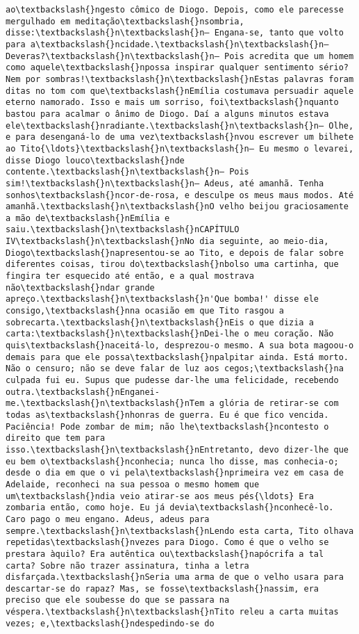 \documentclass[11pt]{article}
\begin{document}
\begin{Verbatim}[commandchars=\\\{\}]
ao\textbackslash{}ngesto cômico de Diogo. Depois, como ele parecesse mergulhado em meditação\textbackslash{}nsombria, disse:\textbackslash{}n\textbackslash{}n— Engana-se, tanto que volto para a\textbackslash{}ncidade.\textbackslash{}n\textbackslash{}n— Deveras?\textbackslash{}n\textbackslash{}n— Pois acredita que um homem como aquele\textbackslash{}npossa inspirar qualquer sentimento sério? Nem por sombras!\textbackslash{}n\textbackslash{}nEstas palavras foram ditas no tom com que\textbackslash{}nEmília costumava persuadir aquele eterno namorado. Isso e mais um sorriso, foi\textbackslash{}nquanto bastou para acalmar o ânimo de Diogo. Daí a alguns minutos estava ele\textbackslash{}nradiante.\textbackslash{}n\textbackslash{}n— Olhe, e para desenganá-lo de uma vez\textbackslash{}nvou escrever um bilhete ao Tito{\ldots}\textbackslash{}n\textbackslash{}n— Eu mesmo o levarei, disse Diogo louco\textbackslash{}nde contente.\textbackslash{}n\textbackslash{}n— Pois sim!\textbackslash{}n\textbackslash{}n— Adeus, até amanhã. Tenha sonhos\textbackslash{}ncor-de-rosa, e desculpe os meus maus modos. Até amanhã.\textbackslash{}n\textbackslash{}nO velho beijou graciosamente a mão de\textbackslash{}nEmília e saiu.\textbackslash{}n\textbackslash{}nCAPÍTULO IV\textbackslash{}n\textbackslash{}nNo dia seguinte, ao meio-dia, Diogo\textbackslash{}napresentou-se ao Tito, e depois de falar sobre diferentes coisas, tirou do\textbackslash{}nbolso uma cartinha, que fingira ter esquecido até então, e a qual mostrava não\textbackslash{}ndar grande apreço.\textbackslash{}n\textbackslash{}n'Que bomba!' disse ele consigo,\textbackslash{}nna ocasião em que Tito rasgou a sobrecarta.\textbackslash{}n\textbackslash{}nEis o que dizia a carta:\textbackslash{}n\textbackslash{}nDei-lhe o meu coração. Não quis\textbackslash{}naceitá-lo, desprezou-o mesmo. A sua bota magoou-o demais para que ele possa\textbackslash{}npalpitar ainda. Está morto. Não o censuro; não se deve falar de luz aos cegos;\textbackslash{}na culpada fui eu. Supus que pudesse dar-lhe uma felicidade, recebendo outra.\textbackslash{}nEnganei-me.\textbackslash{}n\textbackslash{}nTem a glória de retirar-se com todas as\textbackslash{}nhonras de guerra. Eu é que fico vencida. Paciência! Pode zombar de mim; não lhe\textbackslash{}ncontesto o direito que tem para isso.\textbackslash{}n\textbackslash{}nEntretanto, devo dizer-lhe que eu bem o\textbackslash{}nconhecia; nunca lho disse, mas conhecia-o; desde o dia em que o vi pela\textbackslash{}nprimeira vez em casa de Adelaide, reconheci na sua pessoa o mesmo homem que um\textbackslash{}ndia veio atirar-se aos meus pés{\ldots} Era zombaria então, como hoje. Eu já devia\textbackslash{}nconhecê-lo. Caro pago o meu engano. Adeus, adeus para sempre.\textbackslash{}n\textbackslash{}nLendo esta carta, Tito olhava repetidas\textbackslash{}nvezes para Diogo. Como é que o velho se prestara àquilo? Era autêntica ou\textbackslash{}napócrifa a tal carta? Sobre não trazer assinatura, tinha a letra disfarçada.\textbackslash{}nSeria uma arma de que o velho usara para descartar-se do rapaz? Mas, se fosse\textbackslash{}nassim, era preciso que ele soubesse do que se passara na véspera.\textbackslash{}n\textbackslash{}nTito releu a carta muitas vezes; e,\textbackslash{}ndespedindo-se do 
\end{Verbatim}
\end{document}
